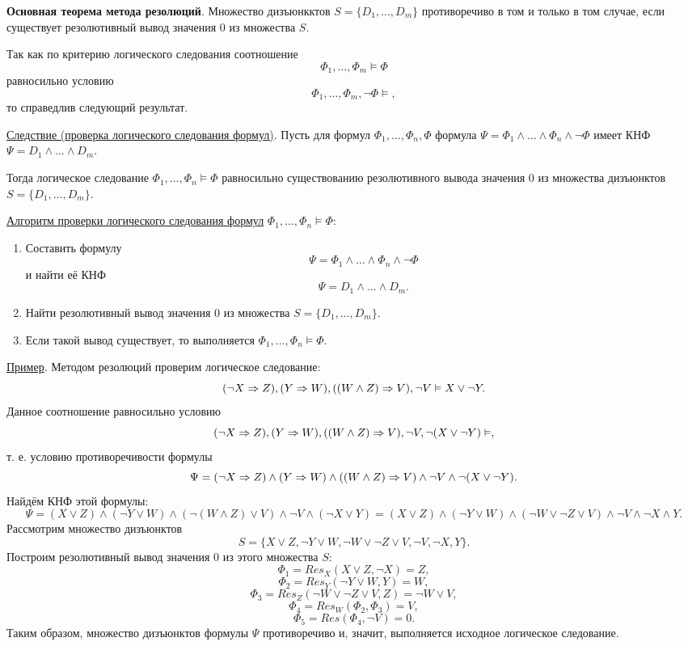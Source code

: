 \textbf{Основная теорема метода резолюций}. Множество дизъюнкктов $S=\{D_1,\dots,D_m\}$ противоречиво в том и только в том случае, если существует резолютивный вывод значения 0 из множества $S$.

Так как по критерию логического следования соотношение $$\Phi_1, \dots, \Phi_m \vDash \Phi$$ равносильно условию $$\Phi_1, \dots, \Phi_m, \lnot \Phi \vDash,$$ то справедлив следующий результат.

\underline{Следствие (проверка логического следования формул)}. Пусть для формул $\Phi_1, \dots, \Phi_n, \Phi$ формула $\Psi = \Phi_1 \land \dots \land \Phi_n \land \lnot \Phi$ имеет КНФ $\Psi = D_1 \land \dots \land D_m$.

Тогда логическое следование $\Phi_1, \dots, \Phi_n \vDash \Phi$ равносильно существованию резолютивного вывода значения 0 из множества дизъюнктов $S = \{D_1, \dots, D_m\}$.

\underline{Алгоритм проверки логического следования формул} $\Phi_1, \dots, \Phi_n \vDash \Phi$:
\begin{enumerate}
    \item Составить формулу $$\Psi = \Phi_1 \land \dots \land \Phi_n \land \lnot \Phi$$ и найти её КНФ $$\Psi = D_1 \land \dots \land D_m.$$
    \item Найти резолютивный вывод значения 0 из множества $S = \{D_1, \dots, D_m\}$.
    \item Если такой вывод существует, то выполняется $\Phi_1, \dots, \Phi_n \vDash \Phi$.
\end{enumerate}

\underline{Пример}. Методом резолюций проверим логическое следование:
$$(\lnot X \Rightarrow Z), (Y \Rightarrow W), ((W \land Z) \Rightarrow V), \lnot V \vDash X \lor \lnot Y.$$
Данное соотношение равносильно условию
$$(\lnot X \Rightarrow Z), (Y \Rightarrow W), ((W \land Z) \Rightarrow V), \lnot V, \lnot(X \lor \lnot Y) \vDash,$$
т. е. условию противоречивости формулы
$$\Psi = (\lnot X \Rightarrow Z) \land (Y \Rightarrow W) \land ((W \land Z) \Rightarrow V) \land \lnot V \land \lnot (X \lor \lnot Y).$$
Найдём КНФ этой формулы:
$$\Psi = (X \lor Z) \land (\lnot Y \lor W) \land (\lnot(W \land Z) \lor V) \land \lnot V \land (\lnot X \lor Y) = (X \lor Z) \land (\lnot Y \lor W) \land (\lnot W \lor \lnot Z \lor V) \land \lnot V \land \lnot X \land Y.$$
Рассмотрим множество дизъюнктов
$$S = \{X \lor Z, \lnot Y \lor W, \lnot W \lor \lnot Z \lor V, \lnot V, \lnot X, Y\}.$$
Построим резолютивный вывод значения 0 из этого множества $S$:
$$\Phi_1 = Res_X(X \lor Z, \lnot X) = Z,$$
$$\Phi_2 = Res_Y(\lnot Y \lor W, Y) = W,$$
$$\Phi_3 = Res_Z(\lnot W \lor \lnot Z \lor V, Z) = \lnot W \lor V,$$
$$\Phi_4 = Res_W(\Phi_2, \Phi_3) = V,$$
$$\Phi_5 = Res(\Phi_4, \lnot V) = 0.$$
Таким образом, множество дизъюнктов формулы $\Psi$ противоречиво и, значит, выполняется исходное логическое следование.

